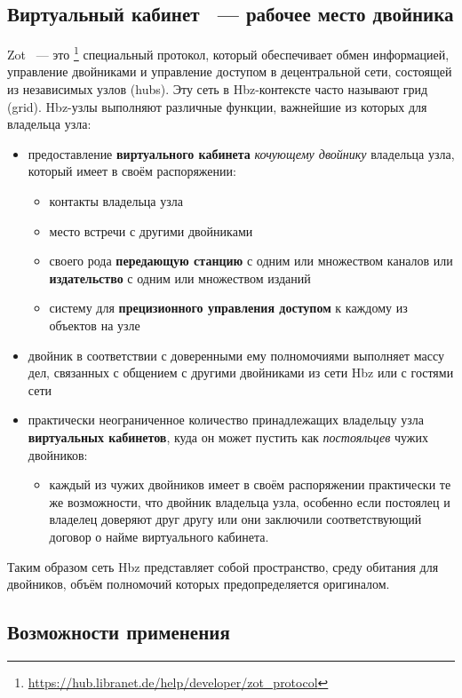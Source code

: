 \documentclass[10pt, a5paper]{article}
\begin{document}
\subsection*{Виртуальный кабинет ~--- рабочее место двойника}

Zot ~--- это \footnote{\url{https://hub.libranet.de/help/developer/zot_protocol}} специальный протокол, который обеспечивает обмен информацией, управление двойниками и управление доступом в децентральной сети, состоящей из независимых узлов (hubs). Эту сеть в Hbz-контексте часто называют грид (grid). Hbz-узлы выполняют различные функции, важнейшие из которых для владельца узла:

\begin{itemize}
  \item предоставление \textbf{виртуального кабинета} \emph{кочующему двойнику} владельца узла, который имеет в своём распоряжении:
  \begin{itemize}
	  \item контакты владельца узла
	  \item место встречи с другими двойниками
	  \item своего рода \textbf{передающую станцию} с одним или множеством каналов или \textbf{издательство} с одним или множеством изданий
	  \item систему для \textbf{прецизионного управления доступом} к каждому из объектов на узле
  \end{itemize}
  \item двойник в соответствии с доверенными ему полномочиями выполняет массу дел, связанных с общением с другими двойниками из сети Hbz или с гостями сети
  \item практически неограниченное количество принадлежащих владельцу узла \textbf{виртуальных кабинетов}, куда он может пустить как \emph{постояльцев} чужих двойников:
	\begin{itemize}
	  	\item каждый из чужих двойников имеет в своём распоряжении практически те же возможности, что двойник владельца узла, особенно если постоялец и владелец доверяют друг другу или они заключили соответствующий договор о найме виртуального кабинета.
	\end{itemize}
\end{itemize}

Таким образом сеть Hbz представляет собой пространство, среду обитания для двойников, объём полномочий которых предопределяется оригиналом.

\subsection*{Возможности применения}
\end{document}
